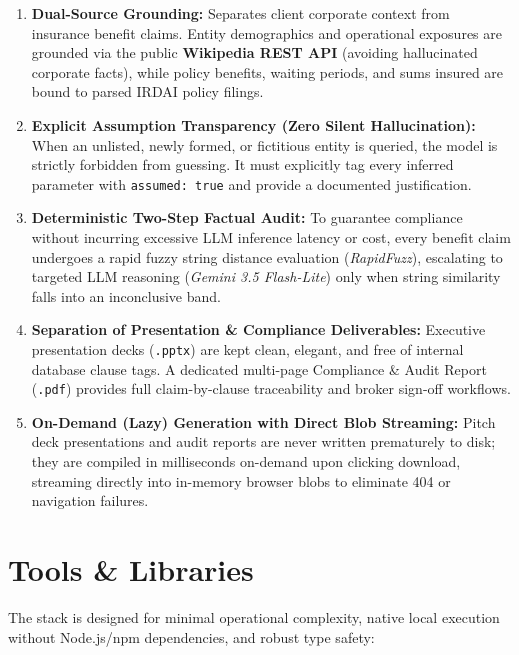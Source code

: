 \documentclass[11pt,a4paper]{article}
\begin{document}
\begin{enumerate}
    \item \textbf{Dual-Source Grounding:} Separates client corporate context from insurance benefit claims. Entity demographics and operational exposures are grounded via the public \textbf{Wikipedia REST API} (avoiding hallucinated corporate facts), while policy benefits, waiting periods, and sums insured are bound to parsed IRDAI policy filings.
    \item \textbf{Explicit Assumption Transparency (Zero Silent Hallucination):} When an unlisted, newly formed, or fictitious entity is queried, the model is strictly forbidden from guessing. It must explicitly tag every inferred parameter with \texttt{assumed: true} and provide a documented justification.
    \item \textbf{Deterministic Two-Step Factual Audit:} To guarantee compliance without incurring excessive LLM inference latency or cost, every benefit claim undergoes a rapid fuzzy string distance evaluation (\textit{RapidFuzz}), escalating to targeted LLM reasoning (\textit{Gemini 3.5 Flash-Lite}) only when string similarity falls into an inconclusive band.
    \item \textbf{Separation of Presentation \& Compliance Deliverables:} Executive presentation decks (\texttt{.pptx}) are kept clean, elegant, and free of internal database clause tags. A dedicated multi-page Compliance \& Audit Report (\texttt{.pdf}) provides full claim-by-clause traceability and broker sign-off workflows.
    \item \textbf{On-Demand (Lazy) Generation with Direct Blob Streaming:} Pitch deck presentations and audit reports are never written prematurely to disk; they are compiled in milliseconds on-demand upon clicking download, streaming directly into in-memory browser blobs to eliminate 404 or navigation failures.
\end{enumerate}

\section{Tools \& Libraries}

The stack is designed for minimal operational complexity, native local execution without Node.js/npm dependencies, and robust type safety:
\end{document}
